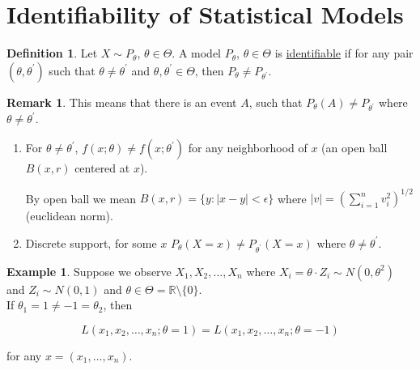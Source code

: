 \documentclass[12pt]{article}
\theoremstyle{definition}
\newtheorem*{definition}{Definition}
\newtheorem*{example}{Example}
\newtheorem*{remark}{Remark}
\begin{document}
\section{Identifiability of Statistical Models}

\begin{definition}
Let $X \sim P_{\theta}$, $\theta \in \Theta$. A model $P_{\theta}$,
$\theta \in \Theta$ is \underline{identifiable} if for any pair 
$(\theta, \theta^{\prime})$ such that $\theta \neq \theta^{\prime}$
and $\theta, \theta^{\prime} \in \Theta$, then
$P_{\theta} \neq P_{\theta^{\prime}}$.
\end{definition}

\begin{remark}
This means that there is an event $A$, such that 
$P_{\theta}(A) \neq P_{\theta^{\prime}}$ where 
$\theta \neq \theta^{\prime}$.

\begin{enumerate}[label = R(\arabic*)]
\item For $\theta \neq \theta^{\prime}$, 
$f(x; \theta) \neq f(x; \theta^{\prime})$ for any neighborhood of
$x$ (an open ball $B(x, r)$ centered at $x$).

By open ball we mean $B(x, r) = \{y : |x-y| < \epsilon \}$ where 
$|v| = (\sum^{n}_{i = 1} v_i^2 )^{1/2}$ (euclidean norm).

\item Discrete support, for some $x$
$P_{\theta}(X = x) \neq P_{\theta^{\prime}}(X = x)$ where
$\theta \neq \theta^{\prime}$.

\end{enumerate}
\end{remark}

\begin{example}
Suppose we observe $X_1, X_2, \ldots, X_n$ where 
$X_i = \theta \cdot Z_i \sim N(0, \theta^2)$ and
$Z_i \sim N(0,1)$ and $\theta \in \Theta = \mathbb{R} \setminus \{0\}$.\\

If $\theta_1 = 1 \neq -1 = \theta_2$, then

\begin{equation*}
L(x_1, x_2, \ldots, x_n; \theta = 1) = L(x_1, x_2, \dots, x_n; \theta = -1)
\end{equation*}

for any $x = (x_1, \ldots, x_n)$.
\end{example}
\end{document}
